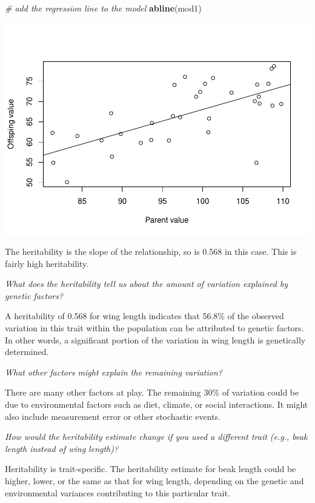 \documentclass[
  a4paper]{book}
\newenvironment{Shaded}{\begin{snugshade}}{\end{snugshade}}
\newcommand{\CommentTok}[1]{\textcolor[rgb]{0.56,0.35,0.01}{\textit{#1}}}
\newcommand{\FunctionTok}[1]{\textcolor[rgb]{0.13,0.29,0.53}{\textbf{#1}}}
\newcommand{\NormalTok}[1]{#1}
\begin{document}
\begin{Shaded}
\begin{Highlighting}[]
\CommentTok{\# add the regression line to the model}
\FunctionTok{abline}\NormalTok{(mod1)}
\end{Highlighting}
\end{Shaded}

\includegraphics{BB512_files/figure-latex/plotheritability-1.pdf}

The heritability is the slope of the relationship, so is 0.568 in this case. This is fairly high heritability.

\emph{What does the heritability tell us about the amount of variation explained by genetic factors?}

A heritability of 0.568 for wing length indicates that 56.8\% of the observed variation in this trait within the population can be attributed to genetic factors. In other words, a significant portion of the variation in wing length is genetically determined.

\emph{What other factors might explain the remaining variation?}

There are many other factors at play. The remaining 30\% of variation could be due to environmental factors such as diet, climate, or social interactions. It might also include measurement error or other stochastic events.

\emph{How would the heritability estimate change if you used a different trait (e.g., beak length instead of wing length)?}

Heritability is trait-specific. The heritability estimate for beak length could be higher, lower, or the same as that for wing length, depending on the genetic and environmental variances contributing to this particular trait.
\end{document}
